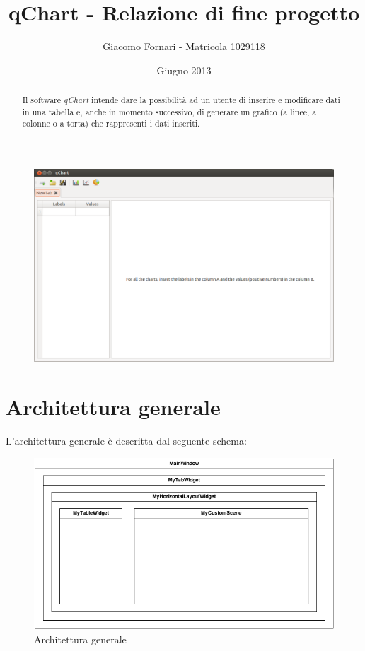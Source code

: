 \documentclass[a4paper,10pt]{article}
\title{qChart - Relazione di fine progetto}
\author{Giacomo Fornari - Matricola 1029118}
\date{Giugno 2013}
\begin{document}
\maketitle

\begin{figure}[h]
    \centering
    \includegraphics[scale=0.30]{gui.png}
\end{figure}

\newpage

\begin{abstract}
Il software \emph{qChart} intende dare la possibilità ad un utente di inserire e modificare dati in una tabella e, anche in momento successivo, di generare un grafico (a linee, a colonne o a torta) che rappresenti i dati inseriti.
\end{abstract}

\section{Architettura generale}
L'architettura generale è descritta dal seguente schema:

\begin{figure}[h]
    \centering
    \includegraphics[scale=0.37]{architettura.png}
    \caption{Architettura generale}
\end{figure}
\end{document}
